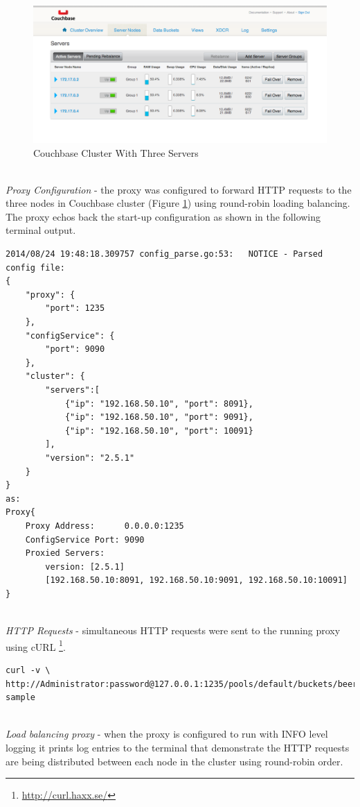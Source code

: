 \documentclass[a4paper,11pt,twoside]{article}
\begin{document}
\begin{figure}[!ht]
  \centering
     \includegraphics[scale=0.40]{couchbase_cluster}
  \caption{Couchbase Cluster With Three Servers}
  \label{couchbase_cluster}
\end{figure}

\noindent\\
\textit{Proxy Configuration} - the proxy was configured to forward HTTP requests to the three nodes in Couchbase cluster (Figure \ref{couchbase_cluster}) using round-robin loading balancing.   The proxy echos back the start-up configuration as shown in the following terminal output.\bigskip
\begin{lstlisting}[language=terminal]
2014/08/24 19:48:18.309757 config_parse.go:53:   NOTICE - Parsed config file:
{
    "proxy": {
        "port": 1235
    },
    "configService": {
        "port": 9090
    },
    "cluster": {
        "servers":[
            {"ip": "192.168.50.10", "port": 8091},
            {"ip": "192.168.50.10", "port": 9091},
            {"ip": "192.168.50.10", "port": 10091}
        ],
        "version": "2.5.1"
    }
}
as:
Proxy{
	Proxy Address:      0.0.0.0:1235
	ConfigService Port: 9090
	Proxied Servers:    
		version: [2.5.1] 
		[192.168.50.10:8091, 192.168.50.10:9091, 192.168.50.10:10091]
}
\end{lstlisting}
\noindent\\
\textit{HTTP Requests} - simultaneous HTTP requests were sent to the running proxy using cURL \footnote{\label{curl_link} \url{http://curl.haxx.se/}}. \smallskip
\begin{lstlisting}[language=terminal]
curl -v \ 
http://Administrator:password@127.0.0.1:1235/pools/default/buckets/beer-sample
\end{lstlisting}

\noindent\\
\textit{Load balancing proxy} - when the proxy is configured to run with INFO level logging it prints log entries to the terminal that demonstrate the HTTP requests are being distributed between each node in the cluster using round-robin order.\smallskip
\end{document}
